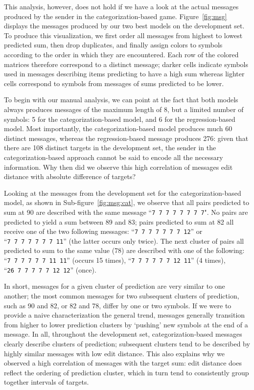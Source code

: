 \documentclass[twocolumn]{article}
\begin{document}
This analysis, however, does not hold if we have a look at the actual messages produced by the sender in the categorization-based game.
Figure~\ref{fig:msg} displays the messages produced by our two best models on the development set. 
To produce this visualization, we first order all messages from highest to lowest predicted sum, then drop duplicates, and finally assign colors to symbols according to the order in which they are encountered.
Each row of the colored matrices therefore correspond to a distinct message; darker cells indicate symbols used in messages describing items predicting to have a high sum whereas lighter cells correspond to symbols from messages of sums predicted to be lower.

To begin with our manual analysis, we can point at the fact that both models always produces messages of the maximum length  of 8, but a limited number of symbols: 5 for the categorization-based model, and 6 for the regression-based model.
Most importantly, the categorization-based model produces much 60 distinct messages, whereas the regression-based message produces 276: given that there are 108 distinct targets in the development set, the sender in the categorization-based approach cannot be said to encode all the necessary information. 
Why then did we observe this high correlation of messages edit distance with absolute difference of targets?

Looking at the messages from the development set for the categorization-based model, as shown in Sub-figure~\ref{fig:msg:cat}, we observe that all pairs predicted to sum at 90 are described with the same message ``\textcolor{Blues-K}{\tt 7~7~7~7~7~7~7~7}". %
No pairs are predicted to yield a sum between 89 and 83; pairs predicted to sum at 82 all receive one of the two following messages: ``{\tt \textcolor{Blues-K}{7~7~7~7~7~7~7}~\textcolor{Blues-I}{12}}'' or ``{\tt \textcolor{Blues-K}{7~7~7~7~7~7~7}~\textcolor{Blues-G}{11}}'' (the latter occurs only twice).
The next cluster of pairs all predicted to sum to the same value (78) are described with one of the following: ``{\tt \textcolor{Blues-K}{7~7~7~7~7~7}~\textcolor{Blues-G}{11~11}}'' (occurs 15 times), ``{\tt \textcolor{Blues-K}{7~7~7~7~7~7}~\textcolor{Blues-I}{12}~\textcolor{Blues-G}{11}}'' (4 times),  ``{\tt \textcolor{Blues-F}{26}~\textcolor{Blues-K}{7~7~7~7~7}~\textcolor{Blues-I}{12~12}}'' (once).

In short, messages for a given cluster of prediction are very similar to one another; the most common messages for two subsequent clusters of prediction, such as 90 and 82, or 82 and 78, differ by one or two symbols.
If we were to provide a naive characterization the general trend, messages generally transition from higher to lower prediction clusters by `pushing' new symbols at the end of a message.
In all, throughout the development set, categorization-based messages clearly describe clusters of prediction; subsequent clusters tend to be described by highly similar messages with low edit distance.
This also explains why we observed a high correlation of messages with the target sum: edit distance does reflect the ordering of prediction cluster, which in turn tend to consistently group together intervals of targets.
\end{document}
